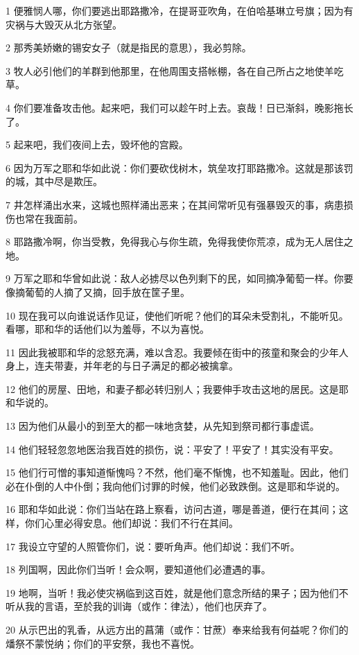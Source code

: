 \par 1 便雅悯人哪，你们要逃出耶路撒冷，在提哥亚吹角，在伯哈基琳立号旗；因为有灾祸与大毁灭从北方张望。
\par 2 那秀美娇嫩的锡安女子（就是指民的意思），我必剪除。
\par 3 牧人必引他们的羊群到他那里，在他周围支搭帐棚，各在自己所占之地使羊吃草。
\par 4 你们要准备攻击他。起来吧，我们可以趁午时上去。哀哉！日已渐斜，晚影拖长了。
\par 5 起来吧，我们夜间上去，毁坏他的宫殿。
\par 6 因为万军之耶和华如此说：你们要砍伐树木，筑垒攻打耶路撒冷。这就是那该罚的城，其中尽是欺压。
\par 7 井怎样涌出水来，这城也照样涌出恶来；在其间常听见有强暴毁灭的事，病患损伤也常在我面前。
\par 8 耶路撒冷啊，你当受教，免得我心与你生疏，免得我使你荒凉，成为无人居住之地。
\par 9 万军之耶和华曾如此说：敌人必掳尽以色列剩下的民，如同摘净葡萄一样。你要像摘葡萄的人摘了又摘，回手放在筐子里。
\par 10 现在我可以向谁说话作见证，使他们听呢？他们的耳朵未受割礼，不能听见。看哪，耶和华的话他们以为羞辱，不以为喜悦。
\par 11 因此我被耶和华的忿怒充满，难以含忍。我要倾在街中的孩童和聚会的少年人身上，连夫带妻，并年老的与日子满足的都必被擒拿。
\par 12 他们的房屋、田地，和妻子都必转归别人；我要伸手攻击这地的居民。这是耶和华说的。
\par 13 因为他们从最小的到至大的都一味地贪婪，从先知到祭司都行事虚谎。
\par 14 他们轻轻忽忽地医治我百姓的损伤，说：平安了！平安了！其实没有平安。
\par 15 他们行可憎的事知道惭愧吗？不然，他们毫不惭愧，也不知羞耻。因此，他们必在仆倒的人中仆倒；我向他们讨罪的时候，他们必致跌倒。这是耶和华说的。
\par 16 耶和华如此说：你们当站在路上察看，访问古道，哪是善道，便行在其间；这样，你们心里必得安息。他们却说：我们不行在其间。
\par 17 我设立守望的人照管你们，说：要听角声。他们却说：我们不听。
\par 18 列国啊，因此你们当听！会众啊，要知道他们必遭遇的事。
\par 19 地啊，当听！我必使灾祸临到这百姓，就是他们意念所结的果子；因为他们不听从我的言语，至於我的训诲（或作：律法），他们也厌弃了。
\par 20 从示巴出的乳香，从远方出的菖蒲（或作：甘蔗）奉来给我有何益呢？你们的燔祭不蒙悦纳；你们的平安祭，我也不喜悦。
